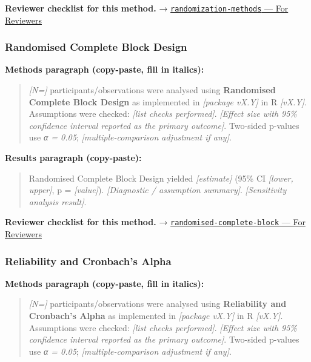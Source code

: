 \documentclass[
]{article}
\begin{document}
\textbf{Reviewer checklist for this method.} →
\href{../chapters/14-clinical/randomization-methods.Rmd\#for-reviewers}{\texttt{randomization-methods}
--- For Reviewers}

\subsubsection{Randomised Complete Block
Design}\label{randomised-complete-block-design}

\textbf{Methods paragraph (copy-paste, fill in italics):}

\begin{quote}
\emph{{[}N={]}} participants/observations were analysed using
\textbf{Randomised Complete Block Design} as implemented in
\emph{{[}package vX.Y{]}} in R \emph{{[}vX.Y{]}}. Assumptions were
checked: \emph{{[}list checks performed{]}}. \emph{{[}Effect size with
95\% confidence interval reported as the primary outcome{]}}. Two-sided
p-values use \emph{α = 0.05}; \emph{{[}multiple-comparison adjustment if
any{]}}.
\end{quote}

\textbf{Results paragraph (copy-paste):}

\begin{quote}
Randomised Complete Block Design yielded \emph{{[}estimate{]}} (95\% CI
\emph{{[}lower, upper{]}}, p = \emph{{[}value{]}}). \emph{{[}Diagnostic
/ assumption summary{]}}. \emph{{[}Sensitivity analysis result{]}}.
\end{quote}

\textbf{Reviewer checklist for this method.} →
\href{../chapters/16-design/randomised-complete-block.Rmd\#for-reviewers}{\texttt{randomised-complete-block}
--- For Reviewers}

\subsubsection{Reliability and Cronbach's
Alpha}\label{reliability-and-cronbachs-alpha}

\textbf{Methods paragraph (copy-paste, fill in italics):}

\begin{quote}
\emph{{[}N={]}} participants/observations were analysed using
\textbf{Reliability and Cronbach's Alpha} as implemented in
\emph{{[}package vX.Y{]}} in R \emph{{[}vX.Y{]}}. Assumptions were
checked: \emph{{[}list checks performed{]}}. \emph{{[}Effect size with
95\% confidence interval reported as the primary outcome{]}}. Two-sided
p-values use \emph{α = 0.05}; \emph{{[}multiple-comparison adjustment if
any{]}}.
\end{quote}
\end{document}
